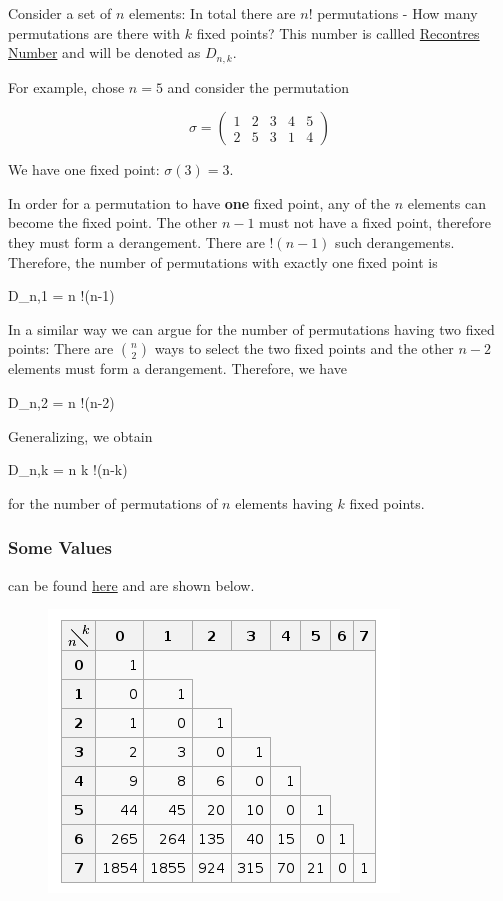 
Consider a set of $n$ elements: In total there are $n!$ permutations - How many permutations are there with $k$ fixed points? This number is callled \href{https://en.wikipedia.org/wiki/Rencontres_numbers}{Recontres Number} and will be denoted as $D_{n,k}$.

For example, chose $n=5$ and consider the permutation

\[
\sigma=\begin{pmatrix}
1 & 2 & 3 & 4 & 5 \\
2 & 5 & 3 & 1 & 4
\end{pmatrix}
\]

We have one fixed point: $\sigma(3) = 3$.

In order for a permutation to have \textbf{one} fixed point, any of the $n$ elements can become the fixed point. The other $n-1$ must not have a fixed point, therefore they must form a derangement. There are $!(n-1)$ such derangements. Therefore, the number of permutations with exactly one fixed point is

\bee
D_{n,1} = n !(n-1)
\eee

In a similar way we can argue for the number of permutations having two fixed points: There are $n \choose 2$ ways to select the two fixed points and the other $n-2$ elements must form a derangement.
Therefore, we have

\bee
D_{n,2} = {n } !(n-2)
\eee

Generalizing, we obtain

\bee
D_{n,k} = {n \choose k} !(n-k)
\eee

for the number of permutations of $n$ elements having $k$ fixed points.

\subsubsection{Some Values}

can be found \href{https://en.wikipedia.org/wiki/Rencontres_numbers}{here} and are shown below.

\begin{figure}
\includegraphics{images/recontres_numbers.png}
\end{figure}

